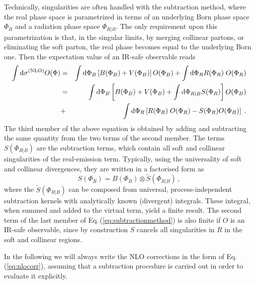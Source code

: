 Technically, singularities are often handled with the subtraction method, 
where the real phase space is parametrized in terms of an underlying Born 
phase space $\Phi_B$ and a radiation phase space $\Phi_{R|B}$. The only 
requirement upon this parametrization is that, in the singular limits, by 
merging collinear partons, or eliminating the soft parton, the real phase 
becomes equal to the underlying Born one.  Then the expectation value of
an IR-safe observable reads
\begin{eqnarray}
\int {\rm d}\sigma^{\rm (NLO)} O(\Phi)&=&
\int {\rm d}\Phi_B\left[B(\Phi_B)+V(\Phi_B)\right]O(\Phi_B)
+\int {\rm d}\Phi_R R(\Phi_R)\; O(\Phi_R)
\nonumber \\
&=&\int {\rm d}\Phi_B\left[B(\Phi_B)+V(\Phi_B)
+\int {\rm d}\Phi_{R|B}S(\Phi_R)\right]O(\Phi_B)
\nonumber \\
&+&\int {\rm d}\Phi_R \left[R(\Phi_R)\; O(\Phi_R)-S(\Phi_R)
O(\Phi_B)\right]\;. \label{eq:subtractionmethod}
\end{eqnarray}
The third member of the above equation is obtained by adding and subtracting
the same quantity from the two terms of the second member.  The terms 
$S(\Phi_{R|B})$ are the subtraction terms, which contain all soft and collinear 
singularities of the real-emission term.  Typically, using the universality 
of soft and collinear divergences, they are written in a factorised form as
\begin{equation}
    S(\Phi_R) = B(\Phi_B)\otimes \tilde S(\Phi_{R|B})\,,
\end{equation}  
where the $\tilde S(\Phi_{R|B})$ can be composed from universal, 
process-independent subtraction kernels with analytically known (divergent) 
integrals.  These integral, when summed and added to the virtual term, yield 
a finite result.  The second term of the last member of 
Eq.\,(\ref{eq:subtractionmethod}) is also finite if $O$ is an IR-safe 
observable, since by construction $S$ cancels all singularities in $R$ in 
the soft and collinear regions.

In the following we will always write the NLO corrections in the form
of Eq.\,(\ref{eq:nlocorr}), assuming that a subtraction procedure is
carried out in order to evaluate it explicitly.

